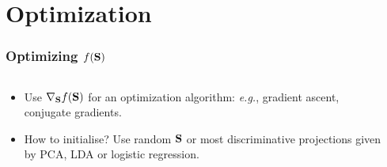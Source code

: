 \documentclass{beamer}
\begin{document}
  \section{Optimization}
   \begin{frame}
      \frametitle{Optimizing $f(\mathbf{S})$}
      \begin{columns}
		\begin{column}{7cm}
			 \begin{itemize}
			    \item Use $\nabla_{\mathbf{S}}f(\mathbf{S})$ for an optimization algorithm: \textit{e.g.}, gradient ascent, conjugate gradients. 
			    \item How to initialise? Use random $\mathbf{S}$ or most discriminative projections given by PCA, LDA or logistic regression.
			 \end{itemize}
		\end{column}
		\begin{column}{5cm}
		\end{column}
	\end{columns}

   \end{frame} 
\end{document}
